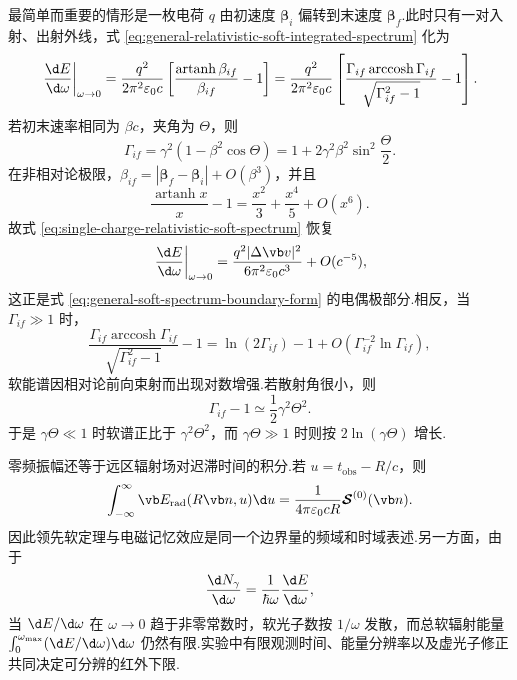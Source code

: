 最简单而重要的情形是一枚电荷 $q$ 由初速度 $\boldsymbol\beta_i$ 偏转到末速度 $\boldsymbol\beta_f$.此时只有一对入射、出射外线，式 \eqref{eq:general-relativistic-soft-integrated-spectrum} 化为
\begin{equation}
 \left.\frac{\d E}{\d\omega}\right|_{\omega\to0}
 =\frac{q^2}{2\pi^2\varepsilon_0c}
 \left[
 \frac{\operatorname{artanh}\beta_{if}}{\beta_{if}}-1
 \right]
 =\frac{q^2}{2\pi^2\varepsilon_0c}
 \left[
 \frac{\Gamma_{if}\operatorname{arccosh}\Gamma_{if}}
 {\sqrt{\Gamma_{if}^2-1}}-1
 \right].
 \label{eq:single-charge-relativistic-soft-spectrum}
\end{equation}
若初末速率相同为 $\beta c$，夹角为 $\Theta$，则
\begin{equation}
 \Gamma_{if}
 =\gamma^2(1-\beta^2\cos\Theta)
 =1+2\gamma^2\beta^2\sin^2\frac{\Theta}{2}.
 \label{eq:equal-speed-relative-gamma}
\end{equation}
在非相对论极限，$\beta_{if}=|\boldsymbol\beta_f-\boldsymbol\beta_i|+O(\beta^3)$，并且
\begin{equation}
 \frac{\operatorname{artanh}x}{x}-1
 =\frac{x^2}{3}+\frac{x^4}{5}+O(x^6).
 \label{eq:soft-function-small-relative-velocity}
\end{equation}
故式 \eqref{eq:single-charge-relativistic-soft-spectrum} 恢复
\begin{equation}
 \left.\frac{\d E}{\d\omega}\right|_{\omega\to0}
 =\frac{q^2|\Delta\vb v|^2}{6\pi^2\varepsilon_0c^3}
 +O(c^{-5}),
 \label{eq:relativistic-soft-nonrel-limit}
\end{equation}
这正是式 \eqref{eq:general-soft-spectrum-boundary-form} 的电偶极部分.相反，当 $\Gamma_{if}\gg1$ 时，
\begin{equation}
 \frac{\Gamma_{if}\operatorname{arccosh}\Gamma_{if}}
 {\sqrt{\Gamma_{if}^2-1}}-1
 =\ln(2\Gamma_{if})-1+O(\Gamma_{if}^{-2}\ln\Gamma_{if}),
 \label{eq:soft-function-ultrarelativistic-limit}
\end{equation}
软能谱因相对论前向束射而出现对数增强.若散射角很小，则
\begin{equation}
 \Gamma_{if}-1\simeq\frac{1}{2}\gamma^2\Theta^2.
\end{equation}
于是 $\gamma\Theta\ll1$ 时软谱正比于 $\gamma^2\Theta^2$，而 $\gamma\Theta\gg1$ 时则按 $2\ln(\gamma\Theta)$ 增长.

零频振幅还等于远区辐射场对迟滞时间的积分.若 $u=t_{\mathrm{obs}}-R/c$，则
\begin{equation}
 \int_{-\infty}^{\infty}\vb E_{\mathrm{rad}}(R\vb n,u)\d u
 =\frac{1}{4\pi\varepsilon_0cR}
 \boldsymbol{\mathcal S}^{(0)}(\vb n).
 \label{eq:electromagnetic-memory-soft}
\end{equation}
因此领先软定理与电磁记忆效应是同一个边界量的频域和时域表述.另一方面，由于
\begin{equation}
 \frac{\d N_\gamma}{\d\omega}
 =\frac{1}{\hbar\omega}\frac{\d E}{\d\omega},
\end{equation}
当 $\d E/\d\omega$ 在 $\omega\to0$ 趋于非零常数时，软光子数按 $1/\omega$ 发散，而总软辐射能量 $\int_0^{\omega_{\max}}(\d E/\d\omega)\d\omega$ 仍然有限.实验中有限观测时间、能量分辨率以及虚光子修正共同决定可分辨的红外下限.

